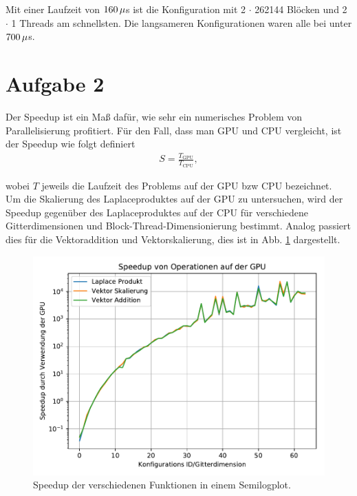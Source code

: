 \documentclass[10pt,a4paper]{article}
\begin{document}
Mit einer Laufzeit von $160\thinspace\mu$s ist die Konfiguration mit \num{2} $\cdot$ \num{262144} Blöcken und \num{2} $\cdot$ \num{1} Threads am schnellsten. Die langsameren Konfigurationen waren alle bei unter $700\thinspace\mu$s.
\section{Aufgabe 2}

Der Speedup ist ein Maß dafür, wie sehr ein numerisches Problem von Parallelisierung profitiert.
Für den Fall, dass man GPU und CPU vergleicht, ist der Speedup wie folgt definiert
\begin{align*}
  S = \frac{T_\text{GPU}}{T_\text{CPU}},
\end{align*}

wobei $T$ jeweils die Laufzeit des Problems auf der GPU bzw CPU bezeichnet.\\

Um die Skalierung des Laplaceproduktes auf der GPU zu untersuchen, wird der Speedup gegenüber
des Laplaceproduktes auf der CPU für verschiedene Gitterdimensionen und
Block-Thread-Dimensionierung bestimmt. Analog passiert dies für die Vektoraddition und Vektorskalierung, dies ist in Abb. \ref{fig:speedup} dargestellt.

\begin{figure}[H]
  \centering
  \includegraphics[width=.85\textwidth]{../aufg2/figures/speedup.pdf}
  \caption{
    Speedup der verschiedenen Funktionen in einem Semilogplot.
  }
  \label{fig:speedup}
\end{figure}
\end{document}

